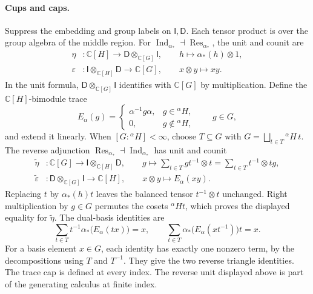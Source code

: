 \documentclass[11pt,a4paper]{article}
\numberwithin{equation}{section}
\theoremstyle{definition}
\newcommand{\C}{\mathbb C}
\newcommand{\Ind}{\operatorname{Ind}}
\newcommand{\Res}{\operatorname{Res}}
\newcommand{\cg}[2]{{}^{#1}\!#2}
\newcommand{\I}{\mathsf I}
\newcommand{\D}{\mathsf D}
\newcommand{\ev}{\varepsilon}
\newcommand{\tv}{\widetilde{\varepsilon}}
\newcommand{\tu}{\widetilde{\eta}}
\begin{document}
\paragraph{Cups and caps.}
Suppress the embedding and group labels on \(\I,\D\).
Each tensor product is over the group algebra of the middle region.
For \(\Ind_{\alpha_*}\dashv\Res_{\alpha_*}\), the unit and counit are
\[
 \begin{aligned}
   \eta &: \C[H]\longrightarrow \D\otimes_{\C[G]}\I,\qquad
      h\longmapsto \alpha_*(h)\otimes 1,\\
   \ev &: \I\otimes_{\C[H]}\D\longrightarrow \C[G],\qquad
      x\otimes y\longmapsto xy.
 \end{aligned}
\]
In the unit formula, \(\D\otimes_{\C[G]}\I\) identifies with \(\C[G]\) by multiplication.
Define the \(\C[H]\)-bimodule trace
\[
 E_\alpha(g)=
 \begin{cases}
 \alpha^{-1}g\alpha,&g\in\cg{\alpha}{H},\\
 0,&g\notin\cg{\alpha}{H},
 \end{cases}
 \qquad g\in G,
\]
and extend it linearly. When \([G:\cg{\alpha}{H}]<\infty\), choose
\(T\subseteq G\) with \(G=\bigsqcup_{t\in T}\cg{\alpha}{H}\,t\).
The reverse adjunction \(\Res_{\alpha_*}\dashv\Ind_{\alpha_*}\) has
unit and counit
\[
 \begin{aligned}
 \tu &: \C[G]\longrightarrow \I\otimes_{\C[H]}\D,\qquad
           g\longmapsto \sum_{t\in T}g t^{-1}\otimes t
                      =\sum_{t\in T}t^{-1}\otimes t g,\\
 \tv &: \D\otimes_{\C[G]}\I\longrightarrow \C[H],\qquad
           x\otimes y\longmapsto E_\alpha(xy).
 \end{aligned}
\]
Replacing \(t\) by \(\alpha_*(h)t\) leaves the balanced tensor
\(t^{-1}\otimes t\) unchanged. Right multiplication by \(g\in G\)
permutes the cosets \(\cg{\alpha}{H}t\), which proves the displayed
equality for \(\tu\). The dual-basis identities are
\[
 \sum_{t\in T}t^{-1}\alpha_*\bigl(E_\alpha(t x)\bigr)=x,
 \qquad
 \sum_{t\in T}\alpha_*\bigl(E_\alpha(x t^{-1})\bigr)t=x .
\]
For a basis element \(x\in G\), each identity has exactly one
nonzero term, by the decompositions using \(T\) and \(T^{-1}\).
They give the two reverse triangle identities. The trace cap is
defined at every index. The reverse unit displayed above is part of
the generating calculus at finite index.
\end{document}
